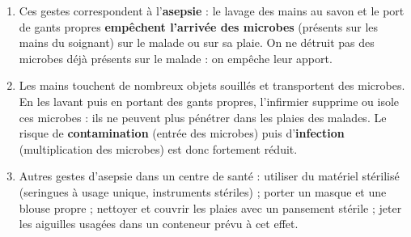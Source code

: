 \documentclass[11pt]{article}
\begin{document}
\begin{corrige}
\begin{enumerate}
\item Ces gestes correspondent à l'\textbf{asepsie} : le lavage des mains au savon et le port de gants propres \textbf{empêchent l'arrivée des microbes} (présents sur les mains du soignant) sur le malade ou sur sa plaie. On ne détruit pas des microbes déjà présents sur le malade : on empêche leur apport.
\item Les mains touchent de nombreux objets souillés et transportent des microbes. En les lavant puis en portant des gants propres, l'infirmier supprime ou isole ces microbes : ils ne peuvent plus pénétrer dans les plaies des malades. Le risque de \textbf{contamination} (entrée des microbes) puis d'\textbf{infection} (multiplication des microbes) est donc fortement réduit.
\item Autres gestes d'asepsie dans un centre de santé : utiliser du matériel stérilisé (seringues à usage unique, instruments stériles) ; porter un masque et une blouse propre ; nettoyer et couvrir les plaies avec un pansement stérile ; jeter les aiguilles usagées dans un conteneur prévu à cet effet.
\end{enumerate}
\end{corrige}
\end{document}
